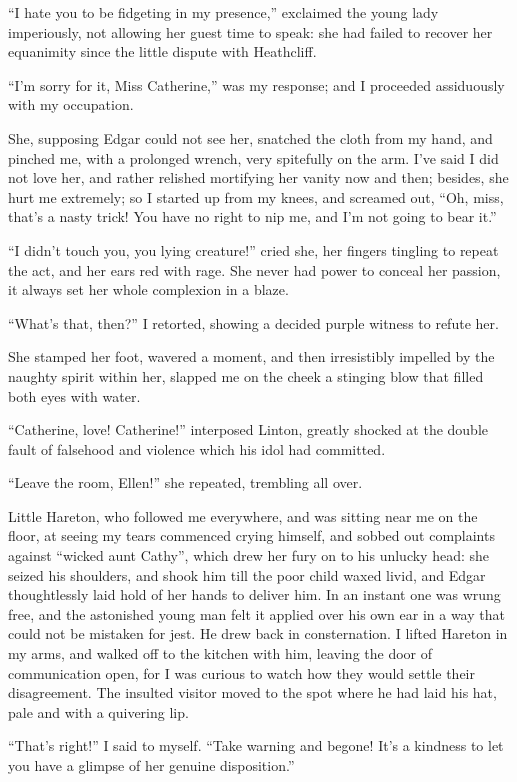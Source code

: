 \par “I hate you to be fidgeting in my presence,” exclaimed the young lady imperiously, not allowing her guest time to speak: she had failed to recover her equanimity since the little dispute with Heathcliff.
\par “I'm sorry for it, Miss Catherine,” was my response; and I proceeded assiduously with my occupation.
\par She, supposing Edgar could not see her, snatched the cloth from my hand, and pinched me, with a prolonged wrench, very spitefully on the arm. I've said I did not love her, and rather relished mortifying her vanity now and then; besides, she hurt me extremely; so I started up from my knees, and screamed out, “Oh, miss, that's a nasty trick! You have no right to nip me, and I'm not going to bear it.”
\par “I didn't touch you, you lying creature!” cried she, her fingers tingling to repeat the act, and her ears red with rage. She never had power to conceal her passion, it always set her whole complexion in a blaze.
\par “What's that, then?” I retorted, showing a decided purple witness to refute her.
\par She stamped her foot, wavered a moment, and then irresistibly impelled by the naughty spirit within her, slapped me on the cheek a stinging blow that filled both eyes with water.
\par “Catherine, love! Catherine!” interposed Linton, greatly shocked at the double fault of falsehood and violence which his idol had committed.
\par “Leave the room, Ellen!” she repeated, trembling all over.
\par Little Hareton, who followed me everywhere, and was sitting near me on the floor, at seeing my tears commenced crying himself, and sobbed out complaints against “wicked aunt Cathy”, which drew her fury on to his unlucky head: she seized his shoulders, and shook him till the poor child waxed livid, and Edgar thoughtlessly laid hold of her hands to deliver him. In an instant one was wrung free, and the astonished young man felt it applied over his own ear in a way that could not be mistaken for jest. He drew back in consternation. I lifted Hareton in my arms, and walked off to the kitchen with him, leaving the door of communication open, for I was curious to watch how they would settle their disagreement. The insulted visitor moved to the spot where he had laid his hat, pale and with a quivering lip.
\par “That's right!” I said to myself. “Take warning and begone! It's a kindness to let you have a glimpse of her genuine disposition.”
